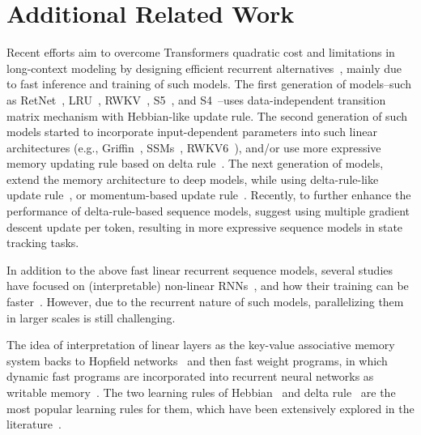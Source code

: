\documentclass{article}
\newcommand{\citep}{\parencite}
\newcommand{\citet}{\textcite}
\theoremstyle{plain}
\theoremstyle{definition}
\theoremstyle{remark}
\newcommand{\head}[1]{\vspace{1.7mm}\noindent{{\textcolor{c2}{\bf #1.}}}}
\begin{document}
\newpage
\printbibliography


\newpage
\appendix



\section{Additional Related Work}

\head{Modern Linear RNNs} 
Recent efforts aim to overcome Transformers quadratic cost and limitations in long-context modeling by designing efficient recurrent alternatives~\citep{tiezzi2024resurgence}, mainly due to fast inference and training of such models. The first generation of models–such as RetNet~\citep{sun2023retentive}, LRU~\citep{orvieto2023resurrecting}, RWKV~\citep{peng2023rwkv}, S5~\citep{smith2023simplified}, and S4~\citep{gu2022efficiently}–uses data-independent transition matrix mechanism with Hebbian-like update rule. The second generation of such models started to incorporate input-dependent parameters into such linear architectures (e.g., Griffin~\citep{de2024griffin}, SSMs~\citep{hasani2023liquid, behrouz2024mambamixer, dao2024transformers}, RWKV6~\citep{peng2024eagle}), and/or use more expressive memory updating rule based on delta rule~\citep{peng2025rwkv7, schlag2021linear, yang2024parallelizing, yang2024gated, liu2024longhorn}. The next generation of models, extend the memory architecture to deep models, while using delta-rule-like update rule~\citep{sun2024learning}, or momentum-based update rule~\citep{behrouz2024titans}. Recently, to further enhance the performance of delta-rule-based sequence models, \citet{siems2025deltaproduct} suggest using multiple gradient descent update per token, resulting in more expressive sequence models in state tracking tasks. 

In addition to the above fast linear recurrent sequence models, several studies have focused on (interpretable) non-linear RNNs~\citep{csordas2024recurrent, merrill2024the, lim2024parallelizing,  schone2025implicit, karami2025lattice, von2023uncovering, gonzalez2024towards}, and how their training can be faster~\citep{gonzalez2024towards, lim2024parallelizing, schone2025implicit}. However, due to the recurrent nature of such models, parallelizing them in larger scales is still challenging. 



\head{Fast Weight Programs}
The idea of interpretation of linear layers as the key-value associative memory system backs to Hopfield networks~\citep{hopfield1982neural} and then fast weight programs, in which dynamic fast programs are incorporated into recurrent neural networks as writable memory~\citep{schlag2021linear, schmidhuber1992learning, schmidhuber1993reducing}. The two learning rules of Hebbian~\citep{hebb2005organization} and delta rule~\citep{prados1989neural} are the most popular learning rules for them, which have been extensively explored in the literature~\citep{munkhdalai2017neural, schmidhuber1992learning, munkhdalai2019metalearned, schlag2021linear, irie2021going, yang2024parallelizing, yang2024gated}. 
\end{document}
